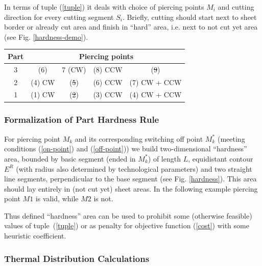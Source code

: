 \documentclass{../download/tPRS2e}
\begin{document}
In terms of tuple (\ref{tuple}) it deals with choice of piercing points $M_i$
and cutting direction for every cutting segment $S_i$.
Briefly, cutting should start next to sheet border or already cut area and finish in “hard” area,
i.e. next to not cut yet area (see Fig. \ref{hardness-demo}).

\begin{center}
\begin{tabular}{ c | c | c | c | c}
  \multicolumn{1}{c|}{Part} & \multicolumn{4}{c}{Piercing points} \\ \hline
  3 & (6) & 7 (CW) & (8) CCW & (\st{9}) \\
  2 & (4) CW & (\st{5}) & (6) CCW & (7) CW +  CCW \\
  1 & (1) CW & (\st{2}) & (3) CCW & (4) CW +  CCW \\
\end{tabular}
\end{center}

\subsubsection{Formalization of Part Hardness Rule}

For piercing point $M_k$ and its corresponding switching off point $M^*_k$
(meeting conditions (\ref{on-point}) and (\ref{off-point}))
we build two-dimensional ``hardness'' area,
bounded by basic segment (ended in  $M^*_k$) of length $L$,
equidistant contour $E^R$  (with radius also determined by technological parameters)
and two straight line segments, perpendicular to the base segment (see Fig. \ref{hardness}).
This area should lay entirely in (not cut yet) sheet areas.
In the following example piercing point $M1$ is valid, while $M2$ is not.

Thus defined ``hardness'' area can be used to prohibit some (otherwise feasible) values of tuple~(\ref{tuple})
or as penalty for objective function (\ref{cost}) with some heuristic coefficient.

\subsubsection{Thermal Distribution Calculations}
\end{document}
